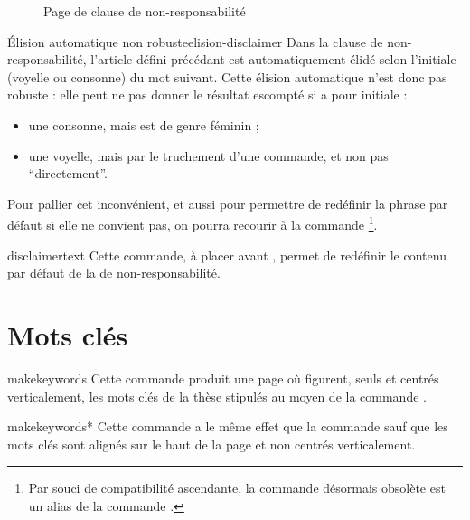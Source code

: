 \begin{figure}[htbp]
  \centering
  \caption{Page de clause de non-responsabilité}
  \label{fig-disclaimerpage}
\end{figure}

\begin{dbwarning}{Élision automatique non robuste}{elision-disclaimer}
  Dans la clause de non-responsabilité, l'article défini précédant
   est automatiquement élidé selon l'initiale (voyelle ou
  consonne) du mot suivant. Cette élision automatique n'est donc pas robuste :
  elle peut ne pas donner le résultat escompté si  a pour
  initiale :
  \begin{itemize}
  \item une consonne, mais est de genre féminin ;
  \item une voyelle, mais par le truchement d'une commande\commandeacronyme, et
    non pas \enquote{directement}.
  \end{itemize}
\end{dbwarning}

Pour pallier cet inconvénient, et aussi pour permettre de redéfinir la phrase
par défaut si elle ne convient pas, on pourra recourir à la commande
\footnote{Par souci de compatibilité ascendante, la
  commande désormais obsolète  est un alias de la commande
  .}.

\begin{docCommand}[doc updated=2020-03-26]{disclaimertext}{}
    Cette commande, à placer avant , permet de redéfinir
    le contenu par défaut de la  de non-responsabilité.
\end{docCommand}

\section{Mots clés}\label{sec-mots-cles}

\begin{docCommand}{makekeywords}{}
  Cette commande produit une page où figurent, seuls et centrés
  verticalement, les mots clés de la thèse stipulés au moyen de la commande
  .
\end{docCommand}
%
\begin{docCommand}{makekeywords*}{}
  Cette commande a le même effet que la commande
   sauf que les mots clés sont alignés sur le haut de la
  page et non centrés verticalement.
\end{docCommand}

